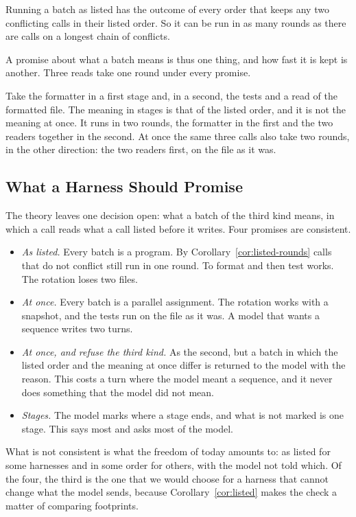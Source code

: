 \documentclass[acmsmall,nonacm,screen]{acmart}
\newcommand{\claim}[2]{#2}
\begin{document}
\begin{corollary}\label{cor:listed-rounds}
Running a batch as listed has the outcome of every order that keeps any two conflicting
calls in their listed order. So it can be run in as many rounds as there are calls on a
longest chain of conflicts.
\end{corollary}

A promise about what a batch means is thus one thing, and how fast it is kept is another.
Three reads take one round under every promise.

\claim{stages-example}{Take the formatter in a first stage and, in a second, the tests and a
read of the formatted file. The meaning in stages is that of the listed order, and it is not
the meaning at once. It runs in two rounds, the formatter in the first and the two readers
together in the second. At once the same three calls also take two rounds, in the other
direction: the two readers first, on the file as it was.}

\subsection{What a Harness Should Promise}

The theory leaves one decision open: what a batch of the third kind means, in which a call
reads what a call listed before it writes. Four promises are consistent.
\begin{itemize}
\item \emph{As listed.} Every batch is a program. By Corollary~\ref{cor:listed-rounds} calls
  that do not conflict still run in one round. To format and then test works. The rotation
  loses two files.
\item \emph{At once.} Every batch is a parallel assignment. The rotation works with a
  snapshot, and the tests run on the file as it was. A model that wants a sequence writes
  two turns.
\item \emph{At once, and refuse the third kind.} As the second, but a batch in which the
  listed order and the meaning at once differ is returned to the model with the reason. This
  costs a turn where the model meant a sequence, and it never does something that the model
  did not mean.
\item \emph{Stages.} The model marks where a stage ends, and what is not marked is one
  stage. This says most and asks most of the model.
\end{itemize}
What is not consistent is what the freedom of today amounts to: as listed for some
harnesses and in some order for others, with the model not told which. Of the four, the
third is the one that we would choose for a harness that cannot change what the model sends,
because Corollary~\ref{cor:listed} makes the check a matter of comparing footprints.
\end{document}
